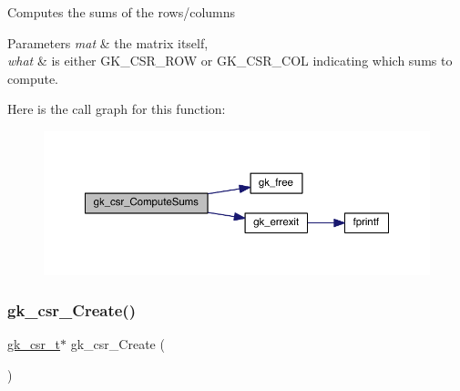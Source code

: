 Computes the sums of the rows/columns 
\begin{DoxyParams}{Parameters}
{\em mat} & the matrix itself, \\
\hline
{\em what} & is either G\+K\+\_\+\+C\+S\+R\+\_\+\+R\+OW or G\+K\+\_\+\+C\+S\+R\+\_\+\+C\+OL indicating which sums to compute. \\
\hline
\end{DoxyParams}
Here is the call graph for this function\+:\nopagebreak
\begin{figure}[H]
\begin{center}
\leavevmode
\includegraphics[width=350pt]{a00023_a3cc2a64b0ead1b41ad824bc9401f1b84_cgraph}
\end{center}
\end{figure}
\mbox{\label{a00023_a82b885bbed5bd18c26629c35ce5d37e4}} 
\subsubsection{\texorpdfstring{gk\+\_\+csr\+\_\+\+Create()}{gk\_csr\_Create()}}
{\footnotesize\ttfamily \hyperlink{a00634}{gk\+\_\+csr\+\_\+t}$\ast$ gk\+\_\+csr\+\_\+\+Create (\begin{DoxyParamCaption}{ }\end{DoxyParamCaption})}

